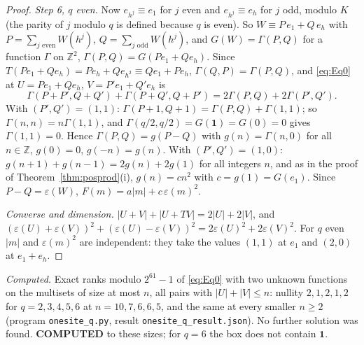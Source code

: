 \begin{proof}
\emph{Step 6, $q$ even.} Now $e_{h^j}\equiv e_1$ for $j$ even and $e_{h^j}\equiv e_h$ for $j$ odd, modulo $K$ (the parity of $j$ modulo $q$ is defined because $q$ is even). So $W\equiv P\,e_1+Q\,e_h$ with $P=\sum_{j\text{ even}}W(h^j)$, $Q=\sum_{j\text{ odd}}W(h^j)$, and $G(W)=\Gamma(P,Q)$ for a function $\Gamma$ on $\mathbb{Z}^2$, $\Gamma(P,Q)=G(Pe_1+Qe_h)$. Since $T(Pe_1+Qe_h)=Pe_h+Qe_{h^2}\equiv Qe_1+Pe_h$, $\Gamma(Q,P)=\Gamma(P,Q)$, and \eqref{eq:Eq0} at $U=Pe_1+Qe_h$, $V=P'e_1+Q'e_h$ is
\[
\Gamma(P+P',Q+Q')+\Gamma(P+Q',Q+P')=2\Gamma(P,Q)+2\Gamma(P',Q').
\]
With $(P',Q')=(1,1)$: $\Gamma(P+1,Q+1)=\Gamma(P,Q)+\Gamma(1,1)$; so $\Gamma(n,n)=n\Gamma(1,1)$, and $\Gamma(q/2,q/2)=G(\mathbf{1})=G(0)=0$ gives $\Gamma(1,1)=0$. Hence $\Gamma(P,Q)=g(P-Q)$ with $g(n)=\Gamma(n,0)$ for all $n\in\mathbb{Z}$, $g(0)=0$, $g(-n)=g(n)$. With $(P',Q')=(1,0)$: $g(n+1)+g(n-1)=2g(n)+2g(1)$ for all integers $n$, and as in the proof of Theorem~\ref{thm:posprod}(i), $g(n)=cn^2$ with $c=g(1)=G(e_1)$. Since $P-Q=\varepsilon(W)$, $F(m)=a|m|+c\,\varepsilon(m)^2$.

\emph{Converse and dimension.} $|U+V|+|U+TV|=2|U|+2|V|$, and $(\varepsilon(U)+\varepsilon(V))^2+(\varepsilon(U)-\varepsilon(V))^2=2\varepsilon(U)^2+2\varepsilon(V)^2$. For $q$ even $|m|$ and $\varepsilon(m)^2$ are independent: they take the values $(1,1)$ at $e_1$ and $(2,0)$ at $e_1+e_h$.
\end{proof}

\emph{Computed.} Exact ranks modulo $2^{61}-1$ of \eqref{eq:Eq0} with two unknown functions on the multisets of size at most $n$, all pairs with $|U|+|V|\le n$: nullity $2,1,2,1,2$ for $q=2,3,4,5,6$ at $n=10,7,6,6,5$, and the same at every smaller $n\ge2$ (program \texttt{onesite\_q.py}, result \texttt{onesite\_q\_result.json}). No further solution was found. \textbf{COMPUTED} to these sizes; for $q=6$ the box does not contain $\mathbf{1}$.

